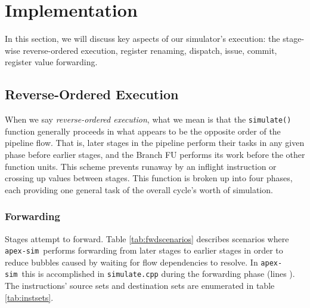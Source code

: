 \documentclass[12pt]{article}
\newcommand{\codename}[0]{\texttt{apex-sim}~}
\begin{document}
\section{Implementation}
\label{sec:implementation}
In this section, we will discuss key aspects of our simulator's execution: the stage-wise reverse-ordered execution, register renaming, dispatch, issue, commit, register value forwarding.

\subsection{Reverse-Ordered Execution}
When we say \textit{reverse-ordered execution}, what we mean is that the \texttt{simulate()} function generally proceeds in what appears to be the opposite order of the pipeline flow. 
That is, later stages in the pipeline perform their tasks in any given phase before earlier stages, and the Branch FU performs its work before the other function units. 
This scheme prevents runaway by an inflight instruction or crossing up values between stages.
This function is broken up into four phases, each providing one general task of the overall cycle's worth of simulation. 

\subsubsection{Forwarding}
Stages attempt to forward. 
Table \ref{tab:fwdscenarios} describes scenarios where \codename performs forwarding from later stages to earlier stages in order to reduce bubbles caused by waiting for flow dependencies to resolve. 
In \codename this is accomplished in \texttt{simulate.cpp} during the forwarding phase (lines ). 
The instructions' source sets and destination sets are enumerated in table \ref{tab:instsets}.
\end{document}
